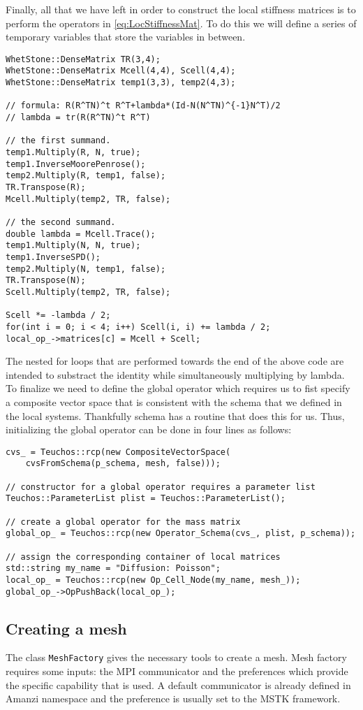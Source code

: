 %
Finally, all that we have left in order to construct the local stiffness matrices is to perform the operators in \eqref{eq:LocStiffnessMat}.
%
To do this we will define a series of temporary variables that store the variables in between.
%
\begin{lstlisting}
WhetStone::DenseMatrix TR(3,4);
WhetStone::DenseMatrix Mcell(4,4), Scell(4,4);
WhetStone::DenseMatrix temp1(3,3), temp2(4,3);

// formula: R(R^TN)^t R^T+lambda*(Id-N(N^TN)^{-1}N^T)/2
// lambda = tr(R(R^TN)^t R^T)

// the first summand.
temp1.Multiply(R, N, true);
temp1.InverseMoorePenrose();
temp2.Multiply(R, temp1, false);
TR.Transpose(R);
Mcell.Multiply(temp2, TR, false);

// the second summand.
double lambda = Mcell.Trace();
temp1.Multiply(N, N, true);
temp1.InverseSPD();
temp2.Multiply(N, temp1, false);
TR.Transpose(N);
Scell.Multiply(temp2, TR, false);

Scell *= -lambda / 2;
for(int i = 0; i < 4; i++) Scell(i, i) += lambda / 2;
local_op_->matrices[c] = Mcell + Scell;
\end{lstlisting} 
%
The nested for loops that are performed towards the end of the above code are intended to substract the identity while simultaneously multiplying by lambda.
\\
To finalize we need to define the global operator which requires us to fist specify a composite vector space that is consistent with the schema that we defined in the local systems.
%
Thankfully schema has a routine that does this for us. 
%
Thus, initializing the global operator can be done in four lines as follows:
%
\begin{lstlisting}
cvs_ = Teuchos::rcp(new CompositeVectorSpace(
    cvsFromSchema(p_schema, mesh, false)));

// constructor for a global operator requires a parameter list
Teuchos::ParameterList plist = Teuchos::ParameterList();

// create a global operator for the mass matrix
global_op_ = Teuchos::rcp(new Operator_Schema(cvs_, plist, p_schema));

// assign the corresponding container of local matrices
std::string my_name = "Diffusion: Poisson";
local_op_ = Teuchos::rcp(new Op_Cell_Node(my_name, mesh_));
global_op_->OpPushBack(local_op_);
\end{lstlisting}


\subsection{Creating a mesh}\label{CreatingAMesh}
The class {\tt MeshFactory} gives the necessary tools to create a mesh. 
Mesh factory requires some inputs: the MPI communicator and the preferences which provide the specific capability that is used. 
A default communicator is already defined in Amanzi namespace and the preference is usually set 
to the MSTK framework.

